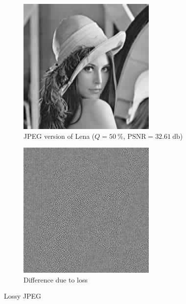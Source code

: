 \documentclass[12pt,english]{article}
\begin{document}
\begin{figure}
\begin{subfigure}[t]{0.3\textwidth}
		\includegraphics[width=.9\textwidth]{img/lenaJPEG8bpp}
		\caption{JPEG version of Lena ($Q=\SI{50}{\percent}$, $\text{PSNR}=\SI{32.61}{\decibel}$)}
		\label{fig:j50lena}
	\end{subfigure}
	\quad%
	\begin{subfigure}[t]{0.3\textwidth}
		\centering
		\includegraphics[width=.9\textwidth]{img/ResultoflenaJPEG}
		\caption{Difference due to loss}
		\label{fig:dlena}
	\end{subfigure}
	\caption{Lossy JPEG}
	\label{fig:jqlena}
\end{figure}
\end{document}
